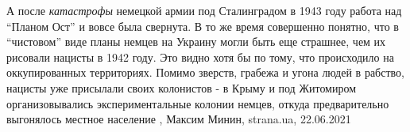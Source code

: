  
 
 
 
 

А после \emph{катастрофы} немецкой армии под Сталинградом в 1943 году работа над
\enquote{Планом Ост} и вовсе была свернута.  В то же время совершенно понятно, что в
\enquote{чистовом} виде планы немцев на Украину могли быть еще страшнее, чем их
рисовали нацисты в 1942 году. Это видно хотя бы по тому, что происходило на
оккупированных территориях.  Помимо зверств, грабежа и угона людей в рабство,
нацисты уже присылали своих колонистов - в Крыму и под Житомиром
организовывались экспериментальные колонии немцев, откуда предварительно
выгонялось местное население
  , Максим Минин, strana.ua, 22.06.2021
